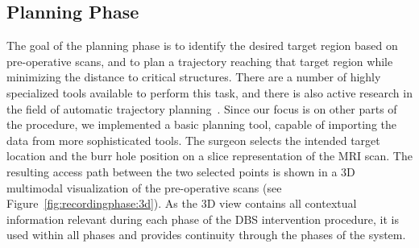 \documentclass{vgtc}                          %
\begin{document}
\subsection{Planning Phase}\label{sec:overview:planning}
The goal of the planning phase is to identify the desired target region based on pre-operative scans, and to plan a trajectory reaching that target region while minimizing the distance to critical structures. There are a number of highly specialized tools available to perform this task, and there is also active research in the field of automatic trajectory planning~\cite{Shamir2010}. Since our focus is on other parts of the procedure, we implemented a basic planning tool, capable of importing the data from more sophisticated tools. The surgeon selects the intended target location and the burr hole position on a slice representation of the MRI scan. The resulting access path between the two selected points is shown in a 3D multimodal visualization of the pre-operative scans (see Figure~\ref{fig:recordingphase:3d}). As the 3D view contains all contextual information relevant during each phase of the DBS intervention procedure, it is used within all phases and provides continuity through the phases of the system.
%
%
%
\end{document}
